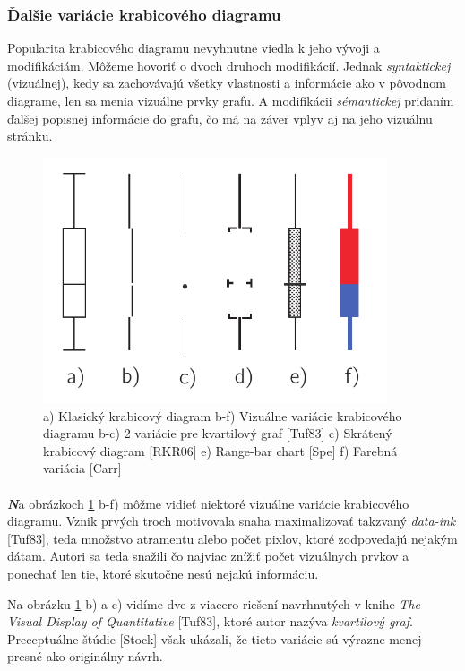 \subsubsection{Ďalšie variácie krabicového diagramu}

Popularita krabicového diagramu nevyhnutne viedla k jeho vývoji a modifikáciám. Môžeme hovoriť o dvoch druhoch modifikácií. Jednak \textit{syntaktickej} (vizuálnej), kedy sa zachovávajú všetky vlastnosti a informácie ako v pôvodnom diagrame, len sa menia vizuálne prvky grafu. A modifikácii \textit{sémantickej} pridaním ďalšej popisnej informácie do grafu, čo má na záver vplyv aj na jeho vizuálnu stránku.


\begin{figure}
	\centering
	\includegraphics[width = 4in]{boxplot2}
	\caption{ a) Klasický krabicový diagram  b-f) Vizuálne variácie krabicového diagramu b-c) 2 variácie pre kvartilový graf [Tuf83] c) Skrátený krabicový diagram [RKR06] e) Range-bar chart [Spe] f) Farebná variácia [Carr]  }
	\label{fig:boxplotmodif1}
\end{figure}


\paragraph{}
{\large \textbf{\textit{N}}}a obrázkoch \ref{fig:boxplotmodif1} b-f) môžme vidieť niektoré vizuálne variácie krabicového diagramu. Vznik prvých troch motivovala snaha maximalizovať takzvaný \textit{data-ink} [Tuf83], teda množstvo atramentu alebo počet pixlov, ktoré zodpovedajú nejakým dátam. Autori sa teda snažili čo najviac znížiť počet vizuálnych prvkov a ponechať len tie, ktoré skutočne nesú nejakú informáciu. 

Na obrázku \ref{fig:boxplotmodif1} b) a c) vidíme dve z viacero riešení navrhnutých v knihe \textit{The Visual Display of Quantitative} [Tuf83], ktoré autor nazýva \textit{kvartilový graf}. Preceptuálne štúdie [Stock] však ukázali, že tieto variácie sú výrazne menej presné ako originálny návrh.


